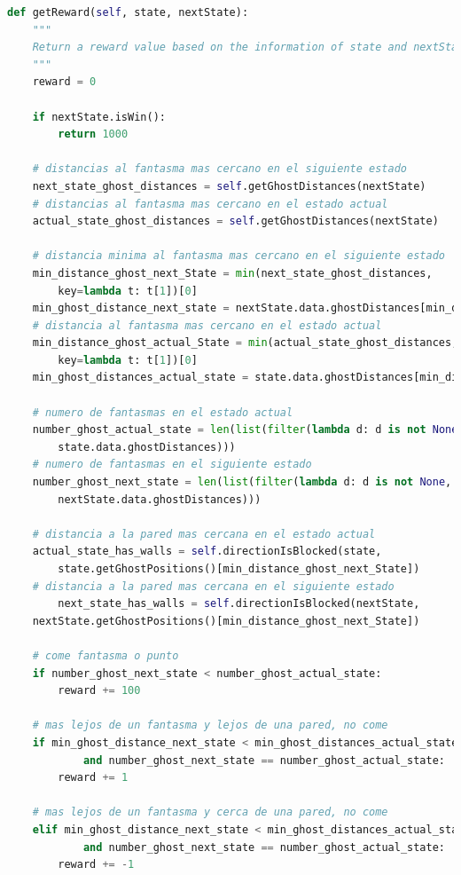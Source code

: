 \documentclass[11pt]{exam}
\begin{document}
\begin{lstlisting}[caption={Función de refuerzo.}, label={reward}, language=python, basicstyle=\footnotesize]
def getReward(self, state, nextState):
	"""
	Return a reward value based on the information of state and nextState
	"""
	reward = 0
	
	if nextState.isWin():
		return 1000
	
	# distancias al fantasma mas cercano en el siguiente estado
	next_state_ghost_distances = self.getGhostDistances(nextState)
	# distancias al fantasma mas cercano en el estado actual
	actual_state_ghost_distances = self.getGhostDistances(nextState)
	
	# distancia minima al fantasma mas cercano en el siguiente estado
	min_distance_ghost_next_State = min(next_state_ghost_distances, 
		key=lambda t: t[1])[0]
	min_ghost_distance_next_state = nextState.data.ghostDistances[min_distance_ghost_next_State]
	# distancia al fantasma mas cercano en el estado actual
	min_distance_ghost_actual_State = min(actual_state_ghost_distances, 
		key=lambda t: t[1])[0]
	min_ghost_distances_actual_state = state.data.ghostDistances[min_distance_ghost_actual_State]
	
	# numero de fantasmas en el estado actual
	number_ghost_actual_state = len(list(filter(lambda d: d is not None, 
		state.data.ghostDistances)))
	# numero de fantasmas en el siguiente estado
	number_ghost_next_state = len(list(filter(lambda d: d is not None, 
		nextState.data.ghostDistances)))
	
	# distancia a la pared mas cercana en el estado actual
	actual_state_has_walls = self.directionIsBlocked(state,
		state.getGhostPositions()[min_distance_ghost_next_State])
	# distancia a la pared mas cercana en el siguiente estado
		next_state_has_walls = self.directionIsBlocked(nextState,
	nextState.getGhostPositions()[min_distance_ghost_next_State])
	
	# come fantasma o punto
	if number_ghost_next_state < number_ghost_actual_state:
		reward += 100
	
	# mas lejos de un fantasma y lejos de una pared, no come
	if min_ghost_distance_next_state < min_ghost_distances_actual_state and not actual_state_has_walls \
			and number_ghost_next_state == number_ghost_actual_state:
		reward += 1
	
	# mas lejos de un fantasma y cerca de una pared, no come
	elif min_ghost_distance_next_state < min_ghost_distances_actual_state and actual_state_has_walls \
			and number_ghost_next_state == number_ghost_actual_state:
		reward += -1
	

\end{lstlisting}
\end{document}
